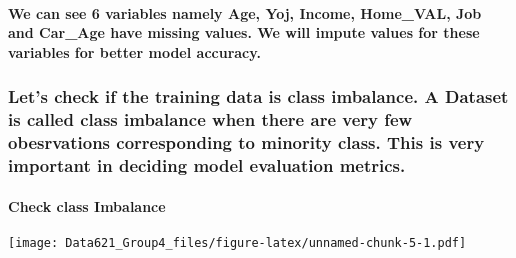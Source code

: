 \documentclass[]{article}
\let\oldparagraph\paragraph
\renewcommand{\paragraph}[1]{\oldparagraph{#1}\mbox{}}
\begin{document}
\hypertarget{we-can-see-6-variables-namely-age-yoj-income-home_val-job-and-car_age-have-missing-values.-we-will-impute-values-for-these-variables-for-better-model-accuracy.}{%
\paragraph{We can see 6 variables namely Age, Yoj, Income, Home\_VAL,
Job and Car\_Age have missing values. We will impute values for these
variables for better model
accuracy.}\label{we-can-see-6-variables-namely-age-yoj-income-home_val-job-and-car_age-have-missing-values.-we-will-impute-values-for-these-variables-for-better-model-accuracy.}}

\hypertarget{lets-check-if-the-training-data-is-class-imbalance.-a-dataset-is-called-class-imbalance-when-there-are-very-few-obesrvations-corresponding-to-minority-class.-this-is-very-important-in-deciding-model-evaluation-metrics.}{%
\subsubsection{\texorpdfstring{\textbf{Let's check if the training data
is class imbalance. A Dataset is called class imbalance when there are
very few obesrvations corresponding to minority class. This is very
important in deciding model evaluation
metrics.}}{Let's check if the training data is class imbalance. A Dataset is called class imbalance when there are very few obesrvations corresponding to minority class. This is very important in deciding model evaluation metrics.}}\label{lets-check-if-the-training-data-is-class-imbalance.-a-dataset-is-called-class-imbalance-when-there-are-very-few-obesrvations-corresponding-to-minority-class.-this-is-very-important-in-deciding-model-evaluation-metrics.}}

\hypertarget{check-class-imbalance}{%
\paragraph{\texorpdfstring{\textbf{Check class
Imbalance}}{Check class Imbalance}}\label{check-class-imbalance}}

\texttt{[image: Data621\_Group4\_files/figure-latex/unnamed-chunk-5-1.pdf]}
\end{document}
